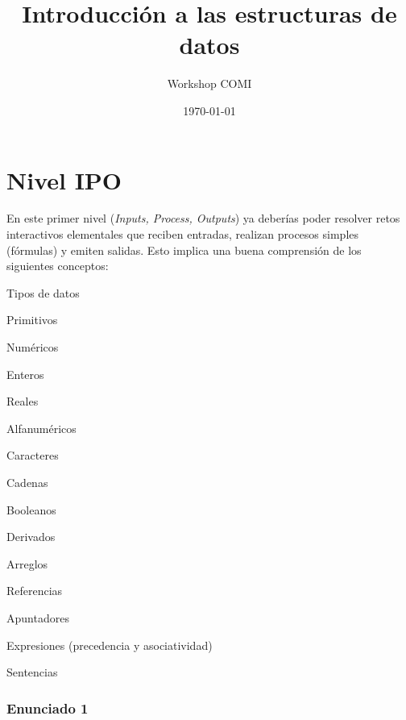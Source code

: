 \documentclass[10pt,letterpaper,twocolumn,spanish]{article}
\title{\vspace{-10mm}
Introducción a las estructuras de datos
}
\author{Workshop COMI}
\date{\today}
\begin{document}
\maketitle
\thispagestyle{empty}

\section*{Nivel IPO}

En este primer nivel (\textit{Inputs, Process, Outputs}) ya deberías poder resolver retos interactivos elementales que reciben entradas, realizan procesos simples (fórmulas) y emiten salidas. Esto implica una buena comprensión de los siguientes conceptos:

\begin{compactitem}
\item Tipos de datos
\begin{compactitem}
\item Primitivos
\begin{compactitem}
\item Numéricos
\begin{compactitem}
\item Enteros
\item Reales
\end{compactitem}
\item Alfanuméricos
\begin{compactitem}
\item Caracteres
\item Cadenas
\end{compactitem}
\item Booleanos
\end{compactitem}
\item Derivados
\begin{compactitem}
\item Arreglos
\item Referencias
\item Apuntadores
\end{compactitem}
\end{compactitem}
\item Expresiones (precedencia y asociatividad)
\item Sentencias
\end{compactitem}

\subsubsection*{Enunciado 1}
\end{document}
